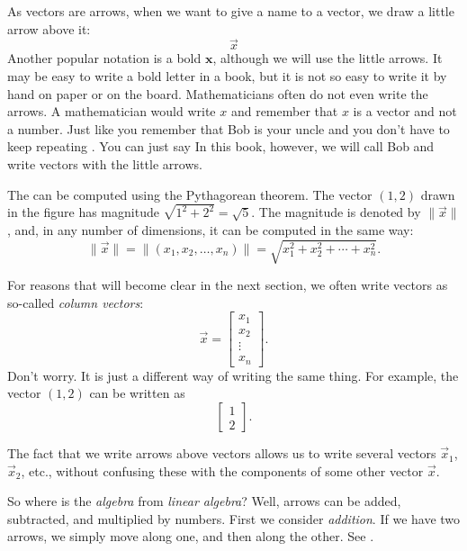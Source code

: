 As vectors are arrows, when we want to give a name to a vector,
we draw a little arrow above it:
\begin{equation*}
\vec{x}
\end{equation*}
Another popular notation is a bold $\mathbf{x}$, although we will use the little
arrows.  It may be easy to write a bold letter in a book, but it is not so
easy to write it by hand on paper or on the board.
Mathematicians often do not even write the arrows.  A mathematician would
write $x$ and remember that $x$ is a vector and not a number.
Just like you remember that Bob is your uncle and you don't have to
keep repeating .  You can just say 
In this book, however, we will call Bob 
and write vectors with the little arrows.

The \emph{} can be computed using the Pythagorean theorem.
The vector $(1,2)$ drawn in the figure has magnitude $\sqrt{1^2+2^2} =
\sqrt{5}$.  The magnitude is denoted by $\lVert \vec{x} \rVert$,
and, in any number of dimensions, it can be computed in the same way:
\begin{equation*}
\lVert \vec{x} \rVert
=
\lVert (x_1,x_2,\ldots,x_n) \rVert
=
\sqrt{x_1^2+x_2^2+\cdots+x_n^2} .
\end{equation*}

For reasons that will become clear in the next section, we often
write vectors as so-called
\emph{column vectors}:
\begin{equation*}
\vec{x} =
\begin{bmatrix}
x_{1} \\ x_2 \\ \vdots \\ x_n
\end{bmatrix} .
\end{equation*}
Don't worry.  It is just a different way of writing the same thing.
For example, the vector $(1,2)$ can be written as
\begin{equation*}
\begin{bmatrix}
1 \\ 2
\end{bmatrix} .
\end{equation*}

The fact that we write arrows above vectors allows us to write several
vectors $\vec{x}_1$, $\vec{x}_2$, etc., without confusing these with the
components of some other vector $\vec{x}$.

So where is the \emph{algebra} from \emph{linear algebra}?
Well, arrows can be added, subtracted,
and multiplied by numbers.
First we consider \emph{addition}.
If we have two arrows, we simply
move along one, and then along the other.  See
.

